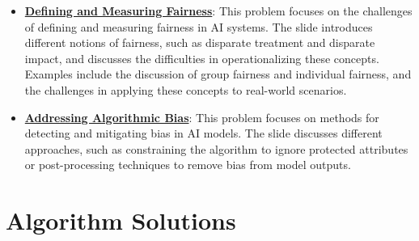 \documentclass{article}%
\begin{document}
\begin{itemize}[leftmargin=*]
\item \href{https://purdue.brightspace.com/d2l/common/assets/pdfjs-d2l-dist/1.0.14-legacy/web/viewer.html?file=\%2Fcontent\%2Fenforced\%2F1095467-wl.202510.CS.24300.001\%2F16L2-ethics.pdf\%3Fou\%3D1095467\&lang=en-us\&container=d2l-fileviewer-rendered-pdf\&fullscreen=d2l-fileviewer-rendered-pdf-dialog\&height=667#page=19}{\textbf{Defining and Measuring Fairness}}: This problem focuses on the challenges of defining and measuring fairness in AI systems. The slide introduces different notions of fairness, such as disparate treatment and disparate impact, and discusses the difficulties in operationalizing these concepts. Examples include the discussion of group fairness and individual fairness, and the challenges in applying these concepts to real-world scenarios.%
\item \href{https://purdue.brightspace.com/d2l/common/assets/pdfjs-d2l-dist/1.0.14-legacy/web/viewer.html?file=\%2Fcontent\%2Fenforced\%2F1095467-wl.202510.CS.24300.001\%2F16L2-ethics.pdf\%3Fou\%3D1095467\&lang=en-us\&container=d2l-fileviewer-rendered-pdf\&fullscreen=d2l-fileviewer-rendered-pdf-dialog\&height=667#page=24}{\textbf{Addressing Algorithmic Bias}}: This problem focuses on methods for detecting and mitigating bias in AI models. The slide discusses different approaches, such as constraining the algorithm to ignore protected attributes or post-processing techniques to remove bias from model outputs.%
\end{itemize}

%
\section{Algorithm Solutions}%
\label{sec:AlgorithmSolutions}%
\end{document}
